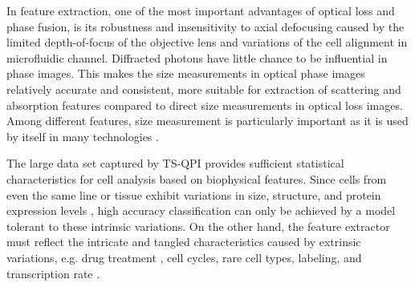 \documentclass[aps,pra,reprint,superscriptaddress]{revtex4-1}
\begin{document}
In feature extraction, one of the most important advantages of optical loss and phase fusion, is its robustness and insensitivity to axial defocusing \cite{spadinger1990effect} caused by the limited depth-of-focus of the objective lens and variations of the cell alignment in microfluidic channel. Diffracted photons have little chance to be influential in phase images. This makes the size measurements in optical phase images relatively accurate and consistent, more suitable for extraction of scattering and absorption features compared to direct size measurements in optical loss images. Among different features, size measurement is particularly important as it is used by itself in many technologies \cite{adams2008highly, nagrath2007isolation, vona2000isolation, gossett2010label}.  

The large data set captured by TS-QPI provides sufficient statistical characteristics for cell analysis based on biophysical features. Since cells from even the same line or tissue exhibit variations in size, structure, and protein expression levels \cite{kaern2005stochasticity, maheshri2007living, zangle2014live}, high accuracy classification can only be achieved by a model tolerant to these intrinsic variations. On the other hand, the feature extractor must reflect the intricate and tangled characteristics caused by extrinsic variations, e.g. drug treatment \cite{spencer2009non}, cell cycles, rare cell types, labeling, and transcription rate \cite{johnston2012mitochondrial}. 
\end{document}

